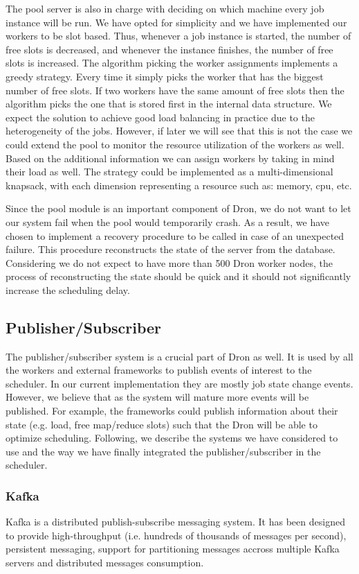\documentclass[11pt,a4paper,twoside]{report}
\begin{document}
The pool server is also in charge with deciding on which machine every job instance will be run. We have opted for simplicity and we have implemented our workers to be slot based. Thus, whenever a job instance is started, the number of free slots is decreased, and whenever the instance finishes, the number of free slots is increased. The algorithm picking the worker assignments implements a greedy strategy. Every time it simply picks the worker that has the biggest number of free slots. If two workers have the same amount of free slots then the algorithm picks the one that is stored first in the internal data structure.  We expect the solution to achieve good load balancing in practice due to the heterogeneity of the jobs. However, if later we will see that this is not the case we could extend the pool to monitor the resource utilization of the workers as well. Based on the additional information we can assign workers by taking in mind their load as well. The strategy could be implemented as a multi-dimensional knapsack, with each dimension representing a resource such as: memory, cpu, etc.


Since the pool module is an important component of Dron, we do not want to let our system fail when the pool would temporarily crash. As a result, we have chosen to implement a recovery procedure to be called in case of an unexpected failure. This procedure reconstructs the state of the server from the database. Considering we do not expect to have more than 500 Dron worker nodes, the process of reconstructing the state should be quick and it should not significantly increase the scheduling delay.

\subsection{Publisher/Subscriber}
The publisher/subscriber system is a crucial part of Dron as well. It is used by all the workers and external frameworks to publish events of interest to the scheduler. In our current implementation they are mostly job state change events. However, we believe that as the system will mature more events will be published. For example, the frameworks could publish information about their state (e.g. load, free map/reduce slots) such that the Dron will be able to optimize scheduling. Following, we describe the systems we have considered to use and the way we have finally integrated the publisher/subscriber in the scheduler.

\subsubsection{Kafka}
Kafka is a distributed publish-subscribe messaging system. It has been designed to provide high-throughput (i.e. hundreds of thousands of messages per second), persistent messaging, support for partitioning messages accross multiple Kafka servers and distributed messages consumption.
\end{document}
